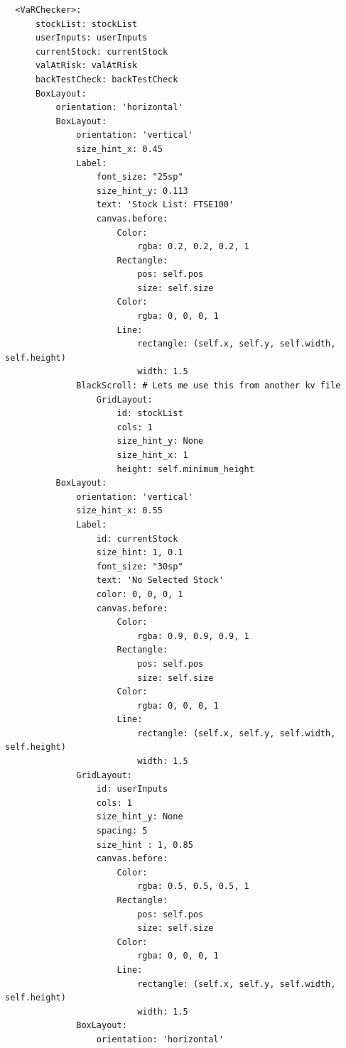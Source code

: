 \documentclass{article}
\begin{document}
\begin{verbatim}
  <VaRChecker>:
      stockList: stockList
      userInputs: userInputs
      currentStock: currentStock
      valAtRisk: valAtRisk
      backTestCheck: backTestCheck
      BoxLayout:
          orientation: 'horizontal'
          BoxLayout:
              orientation: 'vertical'
              size_hint_x: 0.45
              Label:
                  font_size: "25sp"
                  size_hint_y: 0.113
                  text: 'Stock List: FTSE100'
                  canvas.before:
                      Color:
                          rgba: 0.2, 0.2, 0.2, 1
                      Rectangle:
                          pos: self.pos
                          size: self.size
                      Color:
                          rgba: 0, 0, 0, 1 
                      Line:
                          rectangle: (self.x, self.y, self.width, self.height)
                          width: 1.5
              BlackScroll: # Lets me use this from another kv file
                  GridLayout:
                      id: stockList
                      cols: 1
                      size_hint_y: None
                      size_hint_x: 1
                      height: self.minimum_height
          BoxLayout:
              orientation: 'vertical'
              size_hint_x: 0.55
              Label:
                  id: currentStock
                  size_hint: 1, 0.1
                  font_size: "30sp"
                  text: 'No Selected Stock'
                  color: 0, 0, 0, 1
                  canvas.before:
                      Color:
                          rgba: 0.9, 0.9, 0.9, 1
                      Rectangle:
                          pos: self.pos
                          size: self.size
                      Color:
                          rgba: 0, 0, 0, 1 
                      Line:
                          rectangle: (self.x, self.y, self.width, self.height)
                          width: 1.5
              GridLayout:
                  id: userInputs
                  cols: 1
                  size_hint_y: None
                  spacing: 5
                  size_hint : 1, 0.85
                  canvas.before:
                      Color:
                          rgba: 0.5, 0.5, 0.5, 1
                      Rectangle:
                          pos: self.pos
                          size: self.size
                      Color:
                          rgba: 0, 0, 0, 1 
                      Line:
                          rectangle: (self.x, self.y, self.width, self.height)
                          width: 1.5
              BoxLayout:
                  orientation: 'horizontal'

\end{verbatim}
\end{document}
